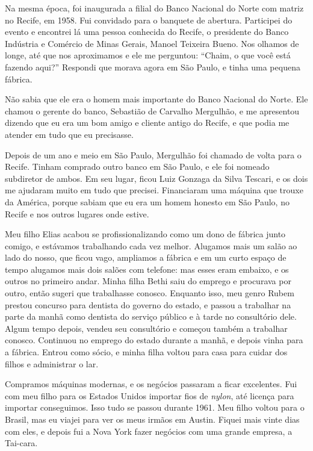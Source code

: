 Na mesma época, foi inaugurada a filial do Banco Nacional do Norte com
matriz no Recife, em 1958. Fui convidado para o
banquete de abertura. Participei do evento e encontrei lá uma pessoa conhecida do Recife, o presidente do Banco
Indústria e Comércio de Minas Gerais, Manoel Teixeira Bueno.
Nos olhamos de longe, até que nos aproximamos e ele me perguntou:
``Chaim, o que você está fazendo aqui?'' Respondi que morava agora em São
Paulo, e tinha uma pequena fábrica.

Não sabia que ele era o homem mais importante do Banco Nacional do
Norte. Ele chamou o gerente do banco, Sebastião de Carvalho Mergulhão, e
me apresentou dizendo que eu era um bom amigo e cliente antigo do
Recife, e que podia me atender em tudo que eu precisasse.

Depois de um ano e meio em São Paulo, Mergulhão foi chamado de volta
para o Recife. Tinham comprado outro banco em São Paulo, e
ele foi nomeado subdiretor de ambos. Em seu lugar, ficou Luiz Gonzaga da
Silva Tescari, e os dois me ajudaram muito em tudo que precisei.
Financiaram uma máquina que trouxe da América, porque sabiam que eu era
um homem honesto em São Paulo, no Recife e nos outros lugares onde estive.

Meu filho Elias acabou se profissionalizando como um dono de fábrica junto comigo, e
estávamos trabalhando cada vez melhor. Alugamos mais um salão ao lado do
nosso, que ficou vago, ampliamos a fábrica e em um curto espaço de
tempo alugamos mais dois salões com telefone: mas esses eram
embaixo, e os outros no primeiro andar. Minha filha Bethi saiu do
emprego e procurava por outro, então sugeri que trabalhasse
conosco. Enquanto isso, meu genro Rubem prestou concurso para dentista do governo do
estado, e passou a trabalhar na parte da manhã como dentista do serviço
público e à tarde no consultório dele. Algum tempo depois, vendeu seu
consultório e começou também a trabalhar conosco. Continuou
no emprego do estado durante a manhã, e depois vinha para a fábrica. Entrou 
como sócio, e minha filha voltou para casa para cuidar dos filhos e
administrar o lar.

Compramos máquinas modernas, e os negócios passaram a ficar excelentes. Fui com
meu filho para os Estados Unidos importar fios de \textit{nylon}, até
licença para importar conseguimos. Isso tudo se passou durante 1961. 
Meu filho voltou para o Brasil, mas eu viajei para ver os
meus irmãos em Austin. Fiquei mais vinte dias com eles, e depois fui a
Nova York fazer negócios com uma grande empresa, a Tai-cara.

